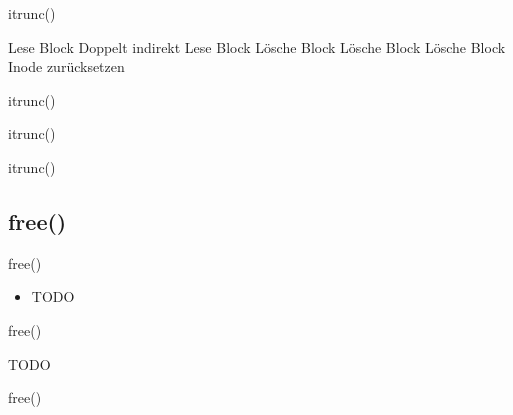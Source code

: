 \documentclass{beamer}
\begin{document}
\begin{frame}{itrunc()}
    \begin{algorithmic}[1]
         \Return \EndIf
                \State Lese Block
                        \Comment Doppelt indirekt
                        \State Lese Block
                            \State Lösche Block
                        \EndFor
                    \EndIf
                    \State Lösche Block
                \EndFor
            \EndIf
            \State Lösche Block
        \EndFor
        \State Inode zurücksetzen
    \end{algorithmic}
\end{frame}

\begin{frame}{itrunc()}
\end{frame}

\begin{frame}{itrunc()}
\end{frame}

\begin{frame}{itrunc()}
\end{frame}




\subsection{free()}

\begin{frame}{free()}
    \begin{itemize}
        \item TODO
    \end{itemize}
\end{frame}

\begin{frame}{free()}
    \begin{algorithmic}[1]
        \State TODO
    \end{algorithmic}
\end{frame}

\begin{frame}{free()}
\end{frame}
\end{document}
